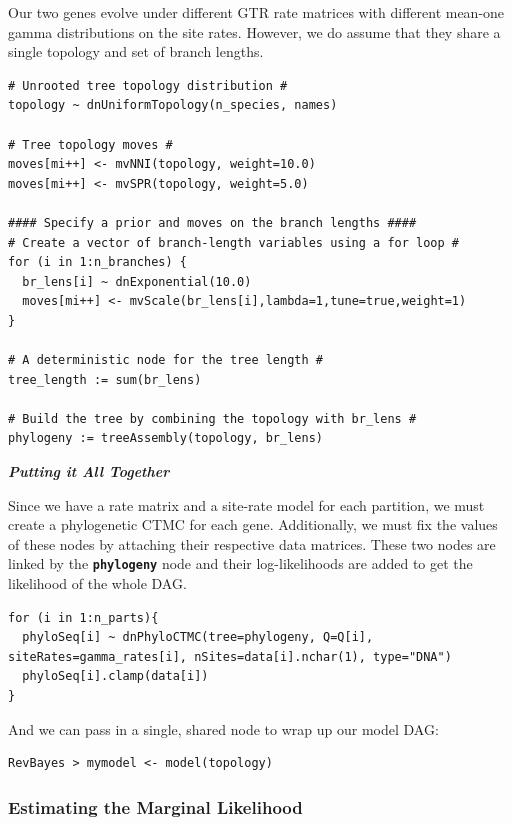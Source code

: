 \documentclass[11pt]{article}
\newcommand{\cl}[1]{{\texttt{\textbf{#1}}}}
\begin{document}
Our two genes evolve under different GTR rate matrices with different mean-one gamma distributions on the site rates.
However, we do assume that they share a single topology and set of branch lengths.
{\tt \begin{snugshade*}
\begin{lstlisting}
# Unrooted tree topology distribution #
topology ~ dnUniformTopology(n_species, names)

# Tree topology moves #
moves[mi++] <- mvNNI(topology, weight=10.0)
moves[mi++] <- mvSPR(topology, weight=5.0)

#### Specify a prior and moves on the branch lengths #### 
# Create a vector of branch-length variables using a for loop #
for (i in 1:n_branches) {
  br_lens[i] ~ dnExponential(10.0)
  moves[mi++] <- mvScale(br_lens[i],lambda=1,tune=true,weight=1) 
}

# A deterministic node for the tree length #
tree_length := sum(br_lens)

# Build the tree by combining the topology with br_lens #
phylogeny := treeAssembly(topology, br_lens)
\end{lstlisting}
\end{snugshade*}}

\textbf{\textit{Putting it All Together}}

Since we have a rate matrix and a site-rate model for each partition, we must create a phylogenetic CTMC for each gene. 
Additionally, we must fix the values of these nodes by attaching their respective data matrices.
These two nodes are linked by the \cl{phylogeny} node and their log-likelihoods are added to get the likelihood of the whole DAG.
{\tt \begin{snugshade*}
\begin{lstlisting}
for (i in 1:n_parts){
  phyloSeq[i] ~ dnPhyloCTMC(tree=phylogeny, Q=Q[i], siteRates=gamma_rates[i], nSites=data[i].nchar(1), type="DNA")
  phyloSeq[i].clamp(data[i])
}
\end{lstlisting}
\end{snugshade*}}


And we can pass in a single, shared node to wrap up our model DAG:
{\tt \begin{snugshade*}
\begin{lstlisting}
RevBayes > mymodel <- model(topology)
\end{lstlisting}
\end{snugshade*}}

\subsubsection*{Estimating the Marginal Likelihood}
\end{document}
